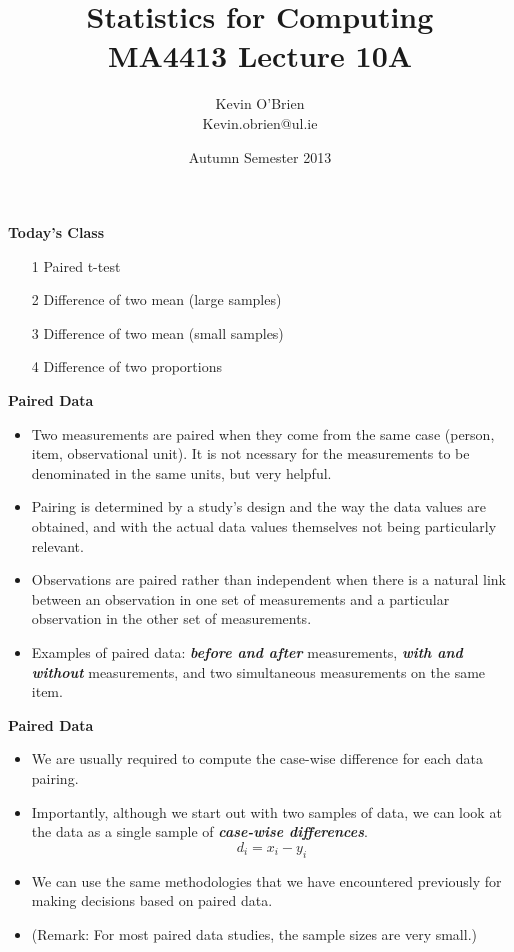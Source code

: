 \documentclass[a4]{beamer}
\title[MA4413]{Statistics for Computing \\ {\normalsize MA4413 Lecture 10A}}
\author[Kevin O'Brien]{Kevin O'Brien \\ {\scriptsize Kevin.obrien@ul.ie}}
\date{Autumn Semester 2013}
\institute[Maths \& Stats]{Dept. of Mathematics \& Statistics, \\ University \textit{of} Limerick}
\begin{document}
\titlepage


\noindent \textbf{Today's Class}
\begin{itemize}
\item[1] Paired t-test
\item[2] Difference of two mean (large samples)
\item[3] Difference of two mean (small samples)
\item[4] Difference of two proportions
\end{itemize}




\noindent \textbf{Paired Data}
\begin{itemize}
\item Two measurements are paired when they come from the same case (person, item, observational unit). It is not ncessary for the measurements to be denominated in the same units, but very helpful.
\item Pairing is determined by a study's design and the way the data values are obtained, and with the actual data values themselves not being particularly relevant. 
\item Observations are paired rather than independent when there is a natural link between an observation in one set of measurements and a particular observation in the other set of measurements.
\item Examples of paired data: \textit{\textbf{before and after}} measurements,\textit{ \textbf{with and without}} measurements, and two simultaneous measurements on the same item.
\end{itemize}


\noindent \textbf{Paired Data}
\begin{itemize}
\item We are usually required to compute the case-wise difference for each data pairing.
\item Importantly, although we start out with two samples of data, we can look at the data as a single sample of \textit{\textbf{case-wise differences}}.
\[d_i = x_i-y_i\]
\item We can use the same methodologies that we have encountered previously for making decisions based on paired data.
\item (Remark: For most paired data studies, the sample sizes are very small.)
\end{itemize}

\end{document}
